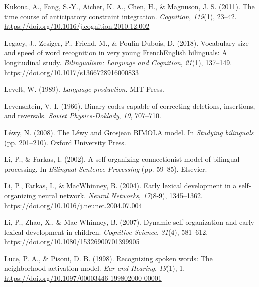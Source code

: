 \documentclass[
  12pt,
  b5paperpaper,
  twoside]{scrreprt}
\newlength{\cslhangindent}
\newlength{\cslentryspacingunit} %
\newenvironment{CSLReferences}[2] %
 {%
  \setlength{\parindent}{0pt}
  \ifodd #1
  \let\oldpar\par
  \def\par{\hangindent=\cslhangindent\oldpar}
  \fi
  \setlength{\parskip}{#2\cslentryspacingunit}
 }%
 {}
\begin{document}
\begin{CSLReferences}{1}{0}
\leavevmode{}%
Kukona, A., Fang, S.-Y., Aicher, K. A., Chen, H., \& Magnuson, J. S.
(2011). The time course of anticipatory constraint integration.
\emph{Cognition}, \emph{119}(1), 23--42.
\url{https://doi.org/10.1016/j.cognition.2010.12.002}

\leavevmode{}%
Legacy, J., Zesiger, P., Friend, M., \& Poulin-Dubois, D. (2018).
Vocabulary size and speed of word recognition in very young
{French}{\textendash}{English} bilinguals: A longitudinal study.
\emph{Bilingualism: Language and Cognition}, \emph{21}(1), 137--149.
\url{https://doi.org/10.1017/s1366728916000833}

\leavevmode{}%
Levelt, W. (1989). \emph{Language production}. {MIT Press}.

\leavevmode{}%
Levenshtein, V. I. (1966). Binary codes capable of correcting deletions,
insertions, and reversals. \emph{Soviet {Physics-Doklady}}, \emph{10},
707--710.

\leavevmode{}%
Léwy, N. (2008). The {L{é}wy} and {Grosjean BIMOLA} model. In
\emph{Studying bilinguals} (pp. 201--210). {Oxford University Press}.

\leavevmode{}%
Li, P., \& Farkas, I. (2002). A self-organizing connectionist model of
bilingual processing. In \emph{Bilingual {Sentence Processing}} (pp.
59--85). {Elsevier}.

\leavevmode{}%
Li, P., Farkas, I., \& MacWhinney, B. (2004). Early lexical development
in a self-organizing neural network. \emph{Neural Networks},
\emph{17}(8-9), 1345--1362.
\url{https://doi.org/10.1016/j.neunet.2004.07.004}

\leavevmode{}%
Li, P., Zhao, X., \& Mac Whinney, B. (2007). Dynamic self-organization
and early lexical development in children. \emph{Cognitive Science},
\emph{31}(4), 581--612. \url{https://doi.org/10.1080/15326900701399905}

\leavevmode{}%
Luce, P. A., \& Pisoni, D. B. (1998). Recognizing spoken words: The
neighborhood activation model. \emph{Ear and Hearing}, \emph{19}(1), 1.
\url{https://doi.org/10.1097/00003446-199802000-00001}


\end{CSLReferences}
\end{document}
